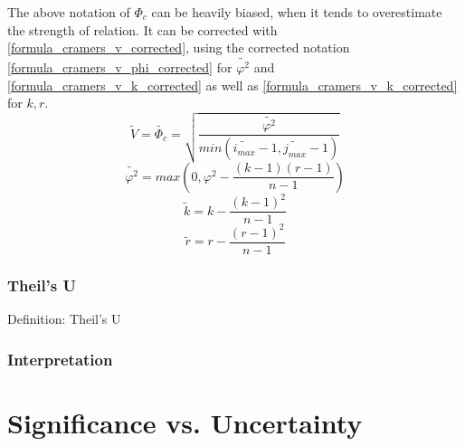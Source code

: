 \documentclass[a4paper,12pt]{report}
\begin{document}
\smallskip

The above notation of $\Phi_c$ can be heavily biased, when it tends to overestimate the strength of relation. It can be corrected with \ref{formula_cramers_v_corrected}, using the corrected notation \ref{formula_cramers_v_phi_corrected} for $\tilde{\varphi^2}$ and \ref{formula_cramers_v_k_corrected} as well as \ref{formula_cramers_v_k_corrected} for $k,r$. \cite{Bergsma2013}
\smallskip
\begin{equation}
\label{formula_cramers_v_corrected}
	\tilde{V} = \tilde{\Phi_c} = \sqrt{\frac{\tilde{\varphi^2}}{min(\tilde{i_{max}}-1,\tilde{j_{max}}-1)}}
\end{equation}
\begin{equation}
\label{formula_cramers_v_phi_corrected}
	\tilde{\varphi^2} = max(0,\varphi^2 - \frac{(k-1)(r-1)}{n-1})
\end{equation}
\begin{equation}
\label{formula_cramers_v_k_corrected}
	\tilde{k} = k - \frac{(k-1)^2}{n-1}
\end{equation}
\begin{equation}
\label{formula_cramers_v_r_corrected}
	\tilde{r} = r - \frac{(r-1)^2}{n-1}
\end{equation}

\bigskip

\subsubsection{Theil’s U}

Definition: Theil’s U

\subsubsection{Interpretation}

%

\section{Significance vs. Uncertainty}
\label{correlation_uncertainty}




\end{document}
